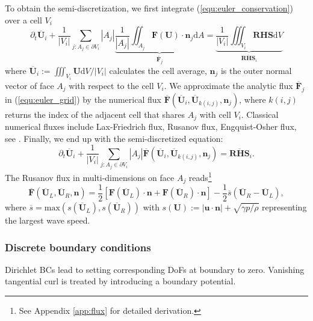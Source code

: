\documentclass{article}
\newcommand{\todo}[1]{\textcolor{blue}{\fbox{\textbf{TODO: #1}}}}
\begin{document}
To obtain the semi-discretization, we first integrate (\ref{equ:euler_conservation}) over a cell $V_i$ 
\begin{equation} \label{equ:euler_grid} 
    \partial_t \overline{\mathbf{U}}_i + \frac{1}{|V_i|}\sum_{j:A_j\in\partial V_i} |A_j|\underbrace{\frac{1}{|A_j|}\iint_{A_j}\mathbf{F}(\mathbf{U})\cdot \mathbf{n}_j \text{d}A}_{\overline{\mathbf{F}}_j} = \underbrace{\frac{1}{|V_i|}\iiint_{V_i} \mathbf{RHS} \text{d}V}_{\overline{\mathbf{RHS}}_i}
\end{equation}
where $\overline{\mathbf{U}}_i := \iiint_{V_i} \mathbf{U} \text{d}V / |V_i|$ calculates the cell average, $\mathbf{n}_j$ is the outer normal vector of face $A_j$ with respect to the cell $V_i$. We approximate the analytic flux $\overline{\mathbf{F}}_j$ in (\ref{equ:euler_grid}) by the numerical flux $\overline{\mathbf{F}}\left(\overline{\mathbf{U}}_i, \overline{\mathbf{U}}_{k(i,j)}, \mathbf{n}_j\right)$, where $k(i,j)$ returns the index of the adjacent cell that shares $A_j$ with cell $V_i$. Classical numerical fluxes include Lax-Friedrich flux, Rusanov flux, Engquist-Osher flux, see \cite[][p. 44-46]{mishra_2019}. Finally, we end up with the semi-discretized equation:
\begin{equation*}
    \partial_t \overline{\mathbf{U}}_i + \frac{1}{|V_i|}\sum_{j:A_j\in\partial V_i} |A_j| \overline{\mathbf{F}}\left(\overline{\mathbf{U}}_i, \overline{\mathbf{U}}_{k(i,j)}, \mathbf{n}_j\right) = \overline{\mathbf{RHS}}_i.
\end{equation*}
The Rusanov flux in multi-dimensions on face $A_j$ reads\footnote{See Appendix \ref{app:flux} for detailed derivation.}
\begin{equation} \label{equ:rusanov-flux-3d}
    \overline{\mathbf{F}}\left(\overline{\mathbf{U}}_L, \overline{\mathbf{U}}_R, \mathbf{n}\right) = \frac{1}{2}\left[\mathbf{F}(\overline{\mathbf{U}}_L)\cdot\mathbf{n} + \mathbf{F}(\overline{\mathbf{U}}_R)\cdot\mathbf{n}\right] - \frac{1}{2}\overline{s}\left(\overline{\mathbf{U}}_R - \overline{\mathbf{U}}_L\right),  
\end{equation}
where $\overline{s} = \text{max}(s(\overline{\mathbf{U}}_L), s(\overline{\mathbf{U}}_R))$ with $s(\mathbf{U}) := |\mathbf{u}\cdot\mathbf{n}| + \sqrt{\gamma p/\rho}$ representing the largest wave speed. 
\subsubsection{Discrete boundary conditions}
Dirichlet BCs lead to setting corresponding DoFs at boundary to zero. Vanishing tangential curl is treated by introducing a boundary potential. 
\todo{More details.}
\end{document}
